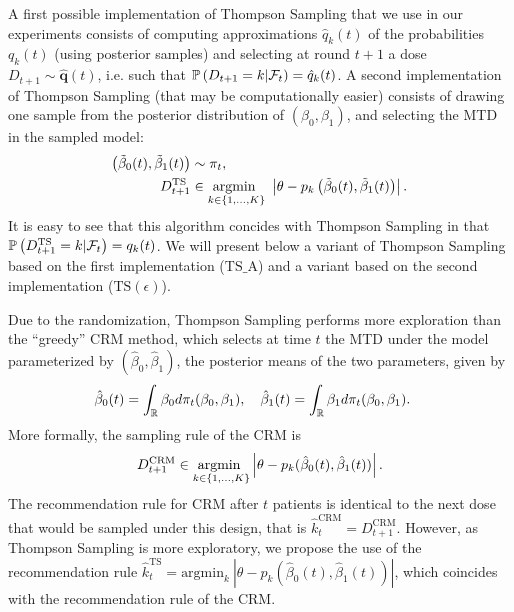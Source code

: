 A first possible implementation of Thompson Sampling that we use in our experiments consists of computing approximations $\hat{q}_k(t)$ of the probabilities ${q}_k(t)$ (using posterior samples) and selecting at round $t+1$ a dose $D_{t+1} \sim \hat{\bm q}(t)$, i.e. such that $\mathbb{P}\left(D_{t+1} = k | \mathcal{F}_t\right) = \hat{q}_k(t)$.
A second implementation of Thompson Sampling (that may be computationally easier) consists of drawing one sample from the posterior distribution of $(\beta_0,\beta_1)$, and selecting the MTD in the sampled model:  
\begin{align}
         \left(\tilde \beta_0(t), \tilde \beta_1(t)\right) & \sim \pi_t, \nonumber\\
          D_{t+1}^{\text{TS}} & \in \argminin{k \in \{1,\dots,K\}} \ \left|\theta - p_k\left(\tilde \beta_0(t),\tilde \beta_1(t)\right)\right|.\label{eq:SampleTS}
\end{align}
It is easy to see that this algorithm concides with Thompson Sampling in that $\mathbb{P}\left(D_{t+1}^{\text{TS}} = k | \mathcal{F}_t\right) = {q}_k(t)$. We will present below a variant of Thompson Sampling based on the first implementation (${\mathrm{TS}\_\mathrm{A}}$) and a variant based on the second implementation (${\mathrm{TS}(\epsilon)}$).

Due to the randomization, Thompson Sampling performs more exploration than the ``greedy'' CRM \citep{OQuigley90CRM} method, which selects at time $t$ the MTD under the model parameterized by $(\hat\beta_0,\hat\beta_1)$, the posterior means of the two parameters, given by
\begin{align}\label{eq:CRMPostMean}
\hat{\beta}_0(t) &= \int_{\mathbb{R}} \beta_0 d\pi_{t}(\beta_0,\beta_1), 
\ \ \ \hat{\beta}_1(t) = \int_{\mathbb{R}} \beta_1 d\pi_{t}(\beta_0,\beta_1).
\end{align}
More formally, the sampling rule of the CRM is
\begin{align*}
D_{t+1}^{\text{CRM}} \in \underset{k \in \{1,\dots,K\}}{\text{argmin }} \left|\theta - p_k(\hat\beta_0(t),\hat\beta_1(t))\right|.
\end{align*}
The recommendation rule for CRM after $t$ patients is identical to the next dose that would be sampled under this design, that is $\hat{k}_t^{\text{CRM}} = D_{t+1}^{\text{CRM}}$. However, as Thompson Sampling is more exploratory, we propose the use of the recommendation rule $\hat{k}_t^{\text{TS}} = \text{argmin}_k \ |\theta - p_k(\hat\beta_0(t),\hat\beta_1(t))|$, which coincides with the recommendation rule of the CRM.

